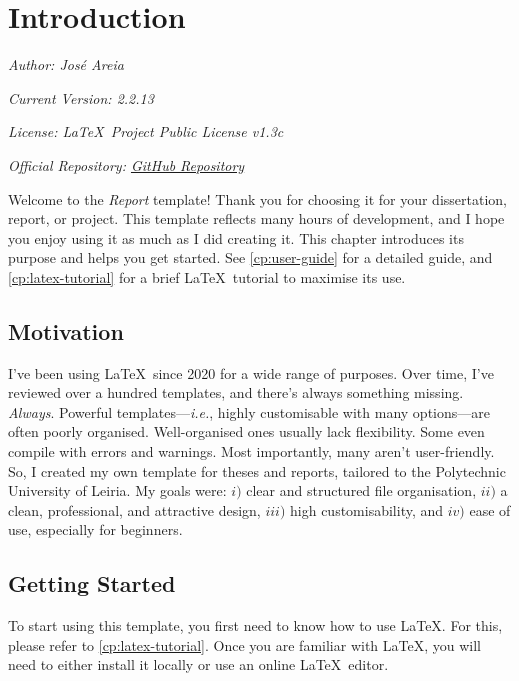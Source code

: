 \chapter[Introduction]{Introduction}
\label{cp:introduction}

{
\parindent0pt

\textit{Author: José Areia}

\textit{Current Version: 2.2.13}

\textit{License: \LaTeX~Project Public License v1.3c}

\textit{Official Repository: \href{https://github.com/joseareia/ipleiria-thesis}{GitHub Repository}}

\vspace{.935em}

Welcome to the \textcolor{maincolor}{\textit{Report}} template! Thank you for choosing it for your dissertation, report, or project. This template reflects many hours of development, and I hope you enjoy using it as much as I did creating it. This chapter introduces its purpose and helps you get started. See \autoref{cp:user-guide} for a detailed guide, and \autoref{cp:latex-tutorial} for a brief \LaTeX~tutorial to maximise its use.
}

\section{Motivation}
I've been using \LaTeX~since 2020 for a wide range of purposes. Over time, I've reviewed over a hundred templates, and there's always something missing. \textit{Always}. Powerful templates---\textit{i.e.}, highly customisable with many options---are often poorly organised. Well-organised ones usually lack flexibility. Some even compile with errors and warnings. Most importantly, many aren't user-friendly. So, I created my own template for theses and reports, tailored to the Polytechnic University of Leiria. My goals were: \(i)\) clear and structured file organisation, \(ii)\) a clean, professional, and attractive design, \(iii)\) high customisability, and \(iv)\) ease of use, especially for beginners.


\section{Getting Started}
To start using this template, you first need to know how to use \LaTeX. For this, please refer to \autoref{cp:latex-tutorial}. Once you are familiar with \LaTeX, you will need to either install it locally or use an online \LaTeX~editor.

